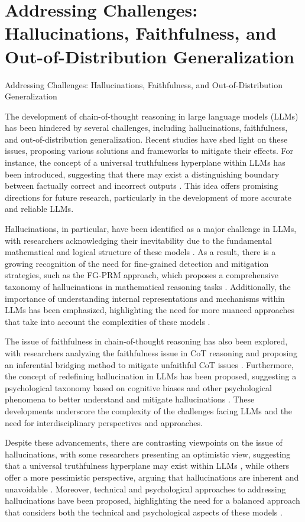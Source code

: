 \documentclass[conference]{IEEEtran}
\begin{document}
\section{Addressing Challenges: Hallucinations, Faithfulness, and Out-of-Distribution Generalization}
Addressing Challenges: Hallucinations, Faithfulness, and Out-of-Distribution Generalization

The development of chain-of-thought reasoning in large language models (LLMs) has been hindered by several challenges, including hallucinations, faithfulness, and out-of-distribution generalization. Recent studies have shed light on these issues, proposing various solutions and frameworks to mitigate their effects. For instance, the concept of a universal truthfulness hyperplane within LLMs has been introduced, suggesting that there may exist a distinguishing boundary between factually correct and incorrect outputs \cite{b1}. This idea offers promising directions for future research, particularly in the development of more accurate and reliable LLMs.

Hallucinations, in particular, have been identified as a major challenge in LLMs, with researchers acknowledging their inevitability due to the fundamental mathematical and logical structure of these models \cite{b4}. As a result, there is a growing recognition of the need for fine-grained detection and mitigation strategies, such as the FG-PRM approach, which proposes a comprehensive taxonomy of hallucinations in mathematical reasoning tasks \cite{b2}. Additionally, the importance of understanding internal representations and mechanisms within LLMs has been emphasized, highlighting the need for more nuanced approaches that take into account the complexities of these models \cite{b3}.

The issue of faithfulness in chain-of-thought reasoning has also been explored, with researchers analyzing the faithfulness issue in CoT reasoning and proposing an inferential bridging method to mitigate unfaithful CoT issues \cite{b3}. Furthermore, the concept of redefining hallucination in LLMs has been proposed, suggesting a psychological taxonomy based on cognitive biases and other psychological phenomena to better understand and mitigate hallucinations \cite{b5}. These developments underscore the complexity of the challenges facing LLMs and the need for interdisciplinary perspectives and approaches.

Despite these advancements, there are contrasting viewpoints on the issue of hallucinations, with some researchers presenting an optimistic view, suggesting that a universal truthfulness hyperplane may exist within LLMs \cite{b1}, while others offer a more pessimistic perspective, arguing that hallucinations are inherent and unavoidable \cite{b4}. Moreover, technical and psychological approaches to addressing hallucinations have been proposed, highlighting the need for a balanced approach that considers both the technical and psychological aspects of these models \cite{b2} \cite{b5}.
\end{document}
